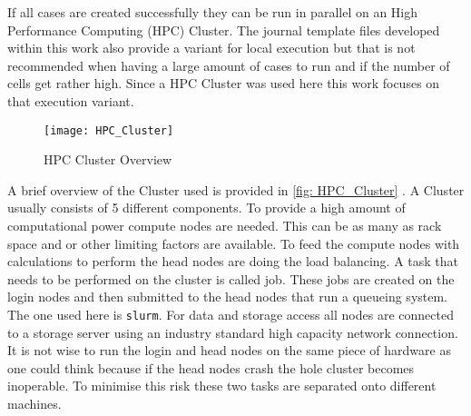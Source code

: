 \documentclass[../thesis.tex]{subfiles}
\begin{document}
If all cases are created successfully they can be run in parallel on an High Performance Computing (HPC) Cluster. The journal template files developed within this work also provide a variant for local execution but that is not recommended when having a large amount of cases to run and if the number of cells get rather high. Since a HPC Cluster was used here this work focuses on that execution variant.

\begin{figure}[htbp]
	\centering
	\texttt{[image: HPC\_Cluster]}
	\caption{HPC Cluster Overview}
	\label{fig: HPC_Cluster}
\end{figure}

A brief overview of the Cluster used is provided in \autoref{fig: HPC_Cluster} \cite{schulz2022hardware_and_num}. A Cluster usually consists of 5 different components. To provide a high amount of computational power compute nodes are needed. This can be as many as rack space and or other limiting factors are available. To feed the compute nodes with calculations to perform the head nodes are doing the load balancing. A task that needs to be performed on the cluster is called job. These jobs are created on the login nodes and then submitted to the head nodes that run a queueing system. The one used here is \texttt{slurm}. For data and storage access all nodes are connected to a storage server using an industry standard high capacity network connection. It is not wise to run the login and head nodes on the same piece of hardware as one could think because if the head nodes crash the hole cluster becomes inoperable. To minimise this risk these two tasks are separated onto different machines.
\end{document}
